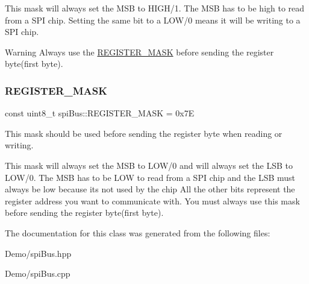 This mask will always set the M\+SB to H\+I\+G\+H/1. The M\+SB has to be high to read from a S\+PI chip. Setting the same bit to a L\+O\+W/0 means it will be writing to a S\+PI chip. \begin{DoxyWarning}{Warning}
Always use the \mbox{\hyperlink{classspi_bus_acd898d08216428963563e20f033423b3}{R\+E\+G\+I\+S\+T\+E\+R\+\_\+\+M\+A\+SK}} before sending the register byte(first byte). 
\end{DoxyWarning}
\mbox{\label{classspi_bus_acd898d08216428963563e20f033423b3}} 
\subsubsection{\texorpdfstring{R\+E\+G\+I\+S\+T\+E\+R\+\_\+\+M\+A\+SK}{REGISTER\_MASK}}
{\footnotesize\ttfamily const uint8\+\_\+t spi\+Bus\+::\+R\+E\+G\+I\+S\+T\+E\+R\+\_\+\+M\+A\+SK = 0x7E\hspace{0.3cm}{\ttfamily [private]}}



This mask should be used before sending the register byte when reading or writing. 

This mask will always set the M\+SB to L\+O\+W/0 and will always set the L\+SB to L\+O\+W/0. The M\+SB has to be L\+OW to read from a S\+PI chip and the L\+SB must always be low because it\textquotesingle{}s not used by the chip All the other bits represent the register address you want to communicate with. You must always use this mask before sending the register byte(first byte). 

The documentation for this class was generated from the following files\+:\begin{DoxyCompactItemize}
\item 
Demo/spi\+Bus.\+hpp\item 
Demo/spi\+Bus.\+cpp\end{DoxyCompactItemize}
